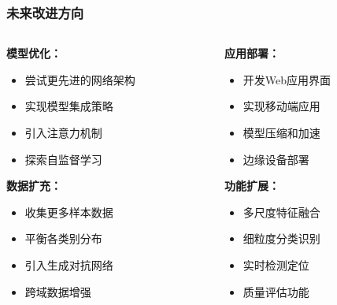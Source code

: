 \documentclass[12pt]{beamer}
\begin{document}
\begin{frame}
\frametitle{未来改进方向}
\begin{columns}
\begin{column}{0.5\textwidth}
\textbf{模型优化：}
\begin{itemize}
    \item 尝试更先进的网络架构
    \item 实现模型集成策略
    \item 引入注意力机制
    \item 探索自监督学习
\end{itemize}

\vspace{0.3cm}
\textbf{数据扩充：}
\begin{itemize}
    \item 收集更多样本数据
    \item 平衡各类别分布
    \item 引入生成对抗网络
    \item 跨域数据增强
\end{itemize}
\end{column}

\begin{column}{0.5\textwidth}
\textbf{应用部署：}
\begin{itemize}
    \item 开发Web应用界面
    \item 实现移动端应用
    \item 模型压缩和加速
    \item 边缘设备部署
\end{itemize}

\vspace{0.3cm}
\textbf{功能扩展：}
\begin{itemize}
    \item 多尺度特征融合
    \item 细粒度分类识别
    \item 实时检测定位
    \item 质量评估功能
\end{itemize}
\end{column}
\end{columns}
\end{frame}
\end{document}
